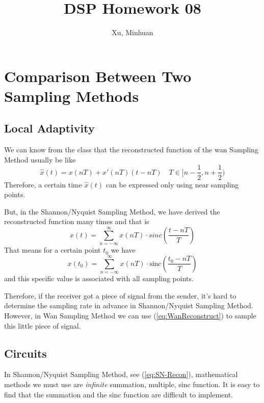 \documentclass{article}
\begin{document}
\title{DSP Homework 08}
\author{Xu, Minhuan}
\maketitle
\tableofcontents
\begin{abstract}

\end{abstract}


\section{Comparison Between Two Sampling Methods}

\subsection{Local Adaptivity}
We can know from the class that the reconstructed function of the wan Sampling Method usually be like
\begin{equation}
	\hat{x}(t) = x(nT) + x'(nT)(t - nT) \quad T \in [n - \frac12, n + \frac12)
	\label{eq:WanReconstruct}
\end{equation}
Therefore, a certain time $\hat{x}(t)$ can be expressed only using near sampling points.

But, in the Shannon/Nyquist Sampling Method, we have derived the reconstructed function many times and that is
\begin{equation}
	x(t) = \sum_{n = - \infty}^{\infty} x(nT) \cdot sinc(\frac{t - nT}{T})
\end{equation}
That means for a certain point $t_0$ we have 
\begin{equation}
	x(t_0) = \sum_{n = - \infty}^{\infty} x(nT) \cdot \mathrm{sinc}(\frac{t_0 - nT}{T})
	\label{eq:SN-Recon}
\end{equation}
and this specific value is associated with all sampling points.

Therefore, if the receiver got a piece of signal from the sender, it's hard to determine the sampling rate in advance in Shannon/Nyquist Sampling Method. However, in Wan Sampling Method we can use (\ref{eq:WanReconstruct}) to sample this little piece of signal.

\subsection{Circuits}
In Shannon/Nyquist Sampling Method, see (\ref{eq:SN-Recon}), mathematical methods we must use are \emph{infinite} summation, multiple, sinc function. It is easy to find that the summation and the sinc function are difficult to implement.
\end{document}
